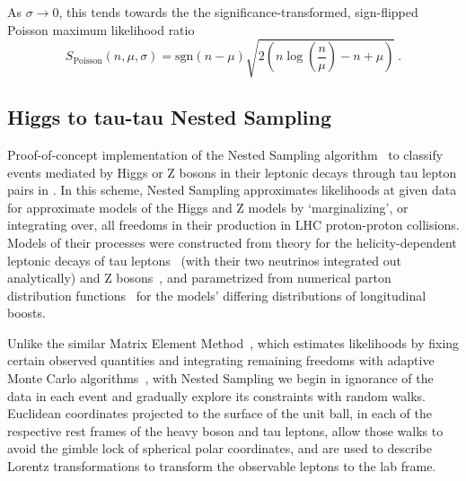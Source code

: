 As $\sigma \rightarrow 0$, this tends towards the the significance-transformed,
sign-flipped Poisson maximum likelihood ratio
\begin{equation}
S_\mathrm{Poisson}(n, \mu, \sigma)
= \mathrm{sgn}(n - \mu) \sqrt{2\left(
    n\log\left(\frac{n}{\mu}\right) - n + \mu
\right)}
~.
\end{equation}



\subsection{Higgs to tau-tau Nested Sampling}
Proof-of-concept implementation of the Nested Sampling algorithm~\cite{
skilling2004nested,
skilling2006nested,
skilling2010foundations
}
to classify events mediated by Higgs or Z bosons in their leptonic decays
through tau lepton pairs in \atlas.
In this scheme, Nested Sampling approximates likelihoods at given data for
approximate models of the Higgs and Z models by `marginalizing',
or integrating over, all freedoms in their production in LHC proton-proton
collisions.
Models of their processes were constructed from theory for the
helicity-dependent leptonic decays of tau leptons~\cite{Hays2014tau}
(with their two neutrinos integrated out analytically)
and Z bosons~\cite{Thomson2011EWK},
and parametrized from numerical parton distribution
functions~\cite{Buckley:2014ana} for the models' differing distributions of
longitudinal boosts.

Unlike the similar Matrix Element Method~\cite{
Fiedler:2010sg,
Gainer:2013iya,
PhysRevD.83.074010
},
which estimates likelihoods by fixing certain observed quantities and
integrating remaining freedoms with adaptive Monte Carlo algorithms~\cite{
Fiedler:2010sg,
Gainer:2013iya,
Lepage:1977sw,
Ohl:1998jn
},
with Nested Sampling we begin in ignorance of the data in each event and
gradually explore its constraints with random walks.
Euclidean coordinates projected to the surface of the unit ball,
in each of the respective rest frames of the heavy boson and tau leptons, allow
those walks to avoid the gimble lock of spherical polar coordinates, and are
used to describe Lorentz transformations to transform the observable leptons
to the lab frame.

